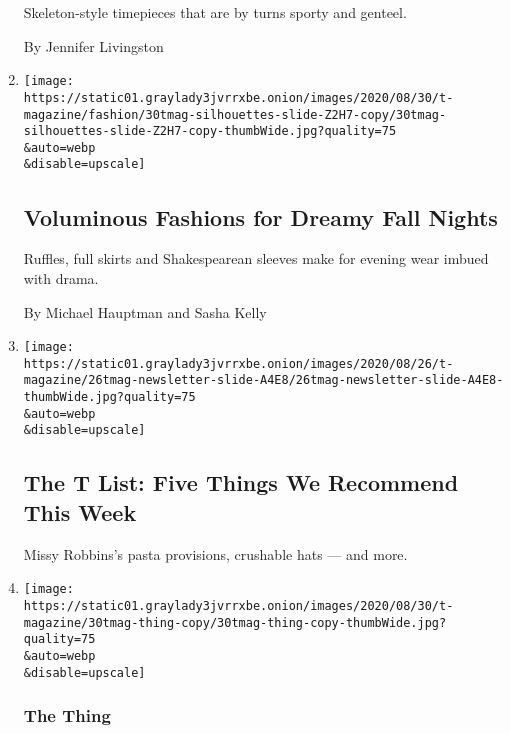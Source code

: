 \begin{enumerate}
  Skeleton-style timepieces that are by turns sporty and genteel.

  By Jennifer Livingston
\item
  \href{/2020/08/27/t-magazine/fall-womens-fashion-silhouettes.html}{}

  \texttt{[image: https://static01.graylady3jvrrxbe.onion/images/2020/08/30/t-magazine/fashion/30tmag-silhouettes-slide-Z2H7-copy/30tmag-silhouettes-slide-Z2H7-copy-thumbWide.jpg?quality=75\\\&auto=webp\\\&disable=upscale]}

  \hypertarget{voluminous-fashions-for-dreamy-fall-nights}{%
  \subsection{Voluminous Fashions for Dreamy Fall
  Nights}\label{voluminous-fashions-for-dreamy-fall-nights}}

  Ruffles, full skirts and Shakespearean sleeves make for evening wear
  imbued with drama.

  By Michael Hauptman and Sasha Kelly
\item
  \href{/2020/08/27/t-magazine/misi-pasta-gregory-halpern.html}{}

  \texttt{[image: https://static01.graylady3jvrrxbe.onion/images/2020/08/26/t-magazine/26tmag-newsletter-slide-A4E8/26tmag-newsletter-slide-A4E8-thumbWide.jpg?quality=75\\\&auto=webp\\\&disable=upscale]}

  \hypertarget{the-t-list-five-things-we-recommend-this-week-1}{%
  \subsection{The T List: Five Things We Recommend This
  Week}\label{the-t-list-five-things-we-recommend-this-week-1}}

  Missy Robbins's pasta provisions, crushable hats --- and more.
\item
  \href{/2020/08/26/t-magazine/cartier-necklace-surnaturel.html}{}

  \texttt{[image: https://static01.graylady3jvrrxbe.onion/images/2020/08/30/t-magazine/30tmag-thing-copy/30tmag-thing-copy-thumbWide.jpg?quality=75\\\&auto=webp\\\&disable=upscale]}

  \hypertarget{the-thing}{%
  \subsubsection{The Thing}\label{the-thing}}

  \hypertarget{a-cartier-necklace-with-opals-that-shine-like-river-stones}{%
}
\end{enumerate}
